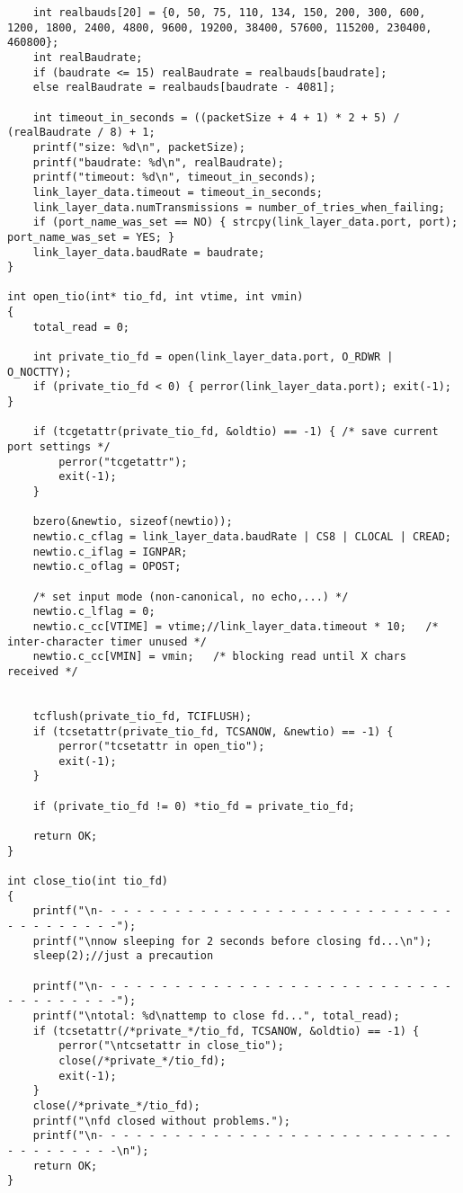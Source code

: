 \begin{lstlisting}
	int realbauds[20] = {0, 50, 75, 110, 134, 150, 200, 300, 600, 1200, 1800, 2400, 4800, 9600, 19200, 38400, 57600, 115200, 230400, 460800};
	int realBaudrate;
	if (baudrate <= 15) realBaudrate = realbauds[baudrate];
	else realBaudrate = realbauds[baudrate - 4081];
	
	int timeout_in_seconds = ((packetSize + 4 + 1) * 2 + 5) / (realBaudrate / 8) + 1;
	printf("size: %d\n", packetSize);
	printf("baudrate: %d\n", realBaudrate);
	printf("timeout: %d\n", timeout_in_seconds);
	link_layer_data.timeout = timeout_in_seconds;
	link_layer_data.numTransmissions = number_of_tries_when_failing;
	if (port_name_was_set == NO) { strcpy(link_layer_data.port, port); port_name_was_set = YES; }
	link_layer_data.baudRate = baudrate;
}

int open_tio(int* tio_fd, int vtime, int vmin)
{
	total_read = 0;

	int private_tio_fd = open(link_layer_data.port, O_RDWR | O_NOCTTY);
	if (private_tio_fd < 0) { perror(link_layer_data.port); exit(-1); }

	if (tcgetattr(private_tio_fd, &oldtio) == -1) { /* save current port settings */
		perror("tcgetattr");
		exit(-1);
	}

	bzero(&newtio, sizeof(newtio));
	newtio.c_cflag = link_layer_data.baudRate | CS8 | CLOCAL | CREAD;
	newtio.c_iflag = IGNPAR;
	newtio.c_oflag = OPOST;

	/* set input mode (non-canonical, no echo,...) */
	newtio.c_lflag = 0;
	newtio.c_cc[VTIME] = vtime;//link_layer_data.timeout * 10;   /* inter-character timer unused */
	newtio.c_cc[VMIN] = vmin;   /* blocking read until X chars received */


	tcflush(private_tio_fd, TCIFLUSH);
	if (tcsetattr(private_tio_fd, TCSANOW, &newtio) == -1) {
		perror("tcsetattr in open_tio");
		exit(-1);
	}

	if (private_tio_fd != 0) *tio_fd = private_tio_fd;

	return OK;
}

int close_tio(int tio_fd)
{
	printf("\n- - - - - - - - - - - - - - - - - - - - - - - - - - - - - - - - - - - - -");
	printf("\nnow sleeping for 2 seconds before closing fd...\n");
	sleep(2);//just a precaution

	printf("\n- - - - - - - - - - - - - - - - - - - - - - - - - - - - - - - - - - - - -");
	printf("\ntotal: %d\nattemp to close fd...", total_read);
	if (tcsetattr(/*private_*/tio_fd, TCSANOW, &oldtio) == -1) {
		perror("\ntcsetattr in close_tio");
		close(/*private_*/tio_fd);
		exit(-1);
	}
	close(/*private_*/tio_fd);
	printf("\nfd closed without problems.");
	printf("\n- - - - - - - - - - - - - - - - - - - - - - - - - - - - - - - - - - - - -\n");
	return OK;
}


\end{lstlisting}
